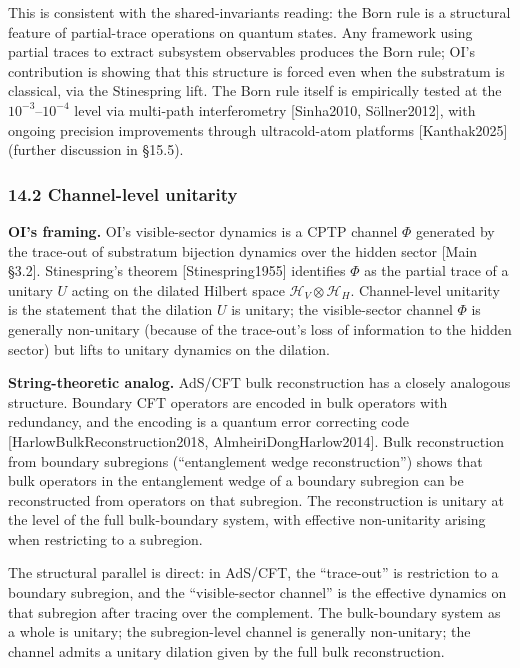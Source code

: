 \documentclass[
]{article}
\begin{document}
This is consistent with the shared-invariants reading: the Born rule is
a structural feature of partial-trace operations on quantum states. Any
framework using partial traces to extract subsystem observables produces
the Born rule; OI's contribution is showing that this structure is
forced even when the substratum is classical, via the Stinespring lift.
The Born rule itself is empirically tested at the
\(10^{-3}\)--\(10^{-4}\) level via multi-path interferometry
{[}Sinha2010, Söllner2012{]}, with ongoing precision improvements
through ultracold-atom platforms {[}Kanthak2025{]} (further discussion
in §15.5).

\hypertarget{channel-level-unitarity}{%
\subsubsection{14.2 Channel-level
unitarity}\label{channel-level-unitarity}}

\textbf{OI's framing.} OI's visible-sector dynamics is a CPTP channel
\(\Phi\) generated by the trace-out of substratum bijection dynamics
over the hidden sector {[}Main §3.2{]}. Stinespring's theorem
{[}Stinespring1955{]} identifies \(\Phi\) as the partial trace of a
unitary \(U\) acting on the dilated Hilbert space
\(\mathcal{H}_V \otimes \mathcal{H}_H\). Channel-level unitarity is the
statement that the dilation \(U\) is unitary; the visible-sector channel
\(\Phi\) is generally non-unitary (because of the trace-out's loss of
information to the hidden sector) but lifts to unitary dynamics on the
dilation.

\textbf{String-theoretic analog.} AdS/CFT bulk reconstruction has a
closely analogous structure. Boundary CFT operators are encoded in bulk
operators with redundancy, and the encoding is a quantum error
correcting code {[}HarlowBulkReconstruction2018,
AlmheiriDongHarlow2014{]}. Bulk reconstruction from boundary subregions
(``entanglement wedge reconstruction'') shows that bulk operators in the
entanglement wedge of a boundary subregion can be reconstructed from
operators on that subregion. The reconstruction is unitary at the level
of the full bulk-boundary system, with effective non-unitarity arising
when restricting to a subregion.

The structural parallel is direct: in AdS/CFT, the ``trace-out'' is
restriction to a boundary subregion, and the ``visible-sector channel''
is the effective dynamics on that subregion after tracing over the
complement. The bulk-boundary system as a whole is unitary; the
subregion-level channel is generally non-unitary; the channel admits a
unitary dilation given by the full bulk reconstruction.
\end{document}
